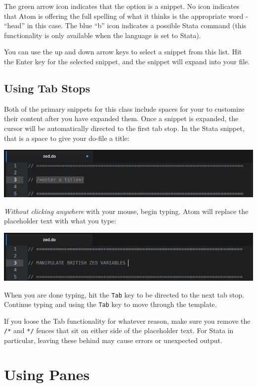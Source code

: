 \documentclass[]{book}
\begin{document}
The green arrow icon indicates that the option is a snippet. No icon
indicates that Atom is offering the full spelling of what it thinks is
the appropriate word - ``head'' in this case. The blue ``b'' icon
indicates a possible Stata command (this functionality is only available
when the language is set to Stata).

You can use the up and down arrow keys to select a snippet from this
list. Hit the Enter key for the selected snippet, and the snippet will
expand into your file.

\subsection{Using Tab Stops}\label{using-tab-stops}

Both of the primary snippets for this class include spaces for your to
customize their content after you have expanded them. Once a snippet is
expanded, the cursor will be automatically directed to the first tab
stop. In the Stata snippet, that is a space to give your do-file a
title:

\includegraphics[width=1\linewidth]{images/atomHead}

\emph{Without clicking anywhere} with your mouse, begin typing. Atom
will replace the placeholder text with what you type:

\includegraphics[width=1\linewidth]{images/atomHead2}

When you are done typing, hit the \texttt{Tab} key to be directed to the
next tab stop. Continue typing and using the \texttt{Tab} key to move
through the template.

If you loose the Tab functionality for whatever reason, make sure you
remove the \texttt{/*} and \texttt{*/} fences that sit on either side of
the placeholder text. For Stata in particular, leaving these behind may
cause errors or unexpected output.

\section{Using Panes}\label{using-panes}
\end{document}
